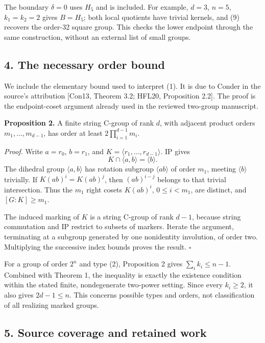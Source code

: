 \documentclass[
  11pt,
  a4paper,
]{article}
\begin{document}
The boundary \(\delta=0\) uses \(H_5\) and is included. For example,
\(d=3\), \(n=5\), \(k_1=k_2=2\) gives \(B=H_5\); both local quotients
have trivial kernels, and (9) recovers the order-32 square group. This
checks the lower endpoint through the same construction, without an
external list of small groups.

\subsection{4. The necessary order
bound}\label{the-necessary-order-bound}

We include the elementary bound used to interpret (1). It is due to
Conder in the source's attribution {[}Con13, Theorem 3.2; HFL20,
Proposition 2.2{]}. The proof is the endpoint-coset argument already
used in the reviewed two-group manuscript.

\textbf{Proposition 2.} A finite string C-group of rank \(d\), with
adjacent product orders \(m_1,\ldots,m_{d-1}\), has order at least
\(2\prod_{i=1}^{d-1}m_i\).

\emph{Proof.} Write \(a=r_0\), \(b=r_1\), and
\(K=\langle r_1,\ldots,r_{d-1}\rangle\). IP gives \[
K\cap\langle a,b\rangle=\langle b\rangle.
\] The dihedral group \(\langle a,b\rangle\) has rotation subgroup
\(\langle ab\rangle\) of order \(m_1\), meeting \(\langle b\rangle\)
trivially. If \(K(ab)^i=K(ab)^j\), then \((ab)^{i-j}\) belongs to that
trivial intersection. Thus the \(m_1\) right cosets \(K(ab)^i\),
\(0\le i<m_1\), are distinct, and \([G:K]\ge m_1\).

The induced marking of \(K\) is a string C-group of rank \(d-1\),
because string commutation and IP restrict to subsets of markers.
Iterate the argument, terminating at a subgroup generated by one
nonidentity involution, of order two. Multiplying the successive index
bounds proves the result. \(\square\)

For a group of order \(2^n\) and type (2), Proposition 2 gives
\(\sum_i k_i\le n-1\). Combined with Theorem 1, the inequality is
exactly the existence condition within the stated finite, nondegenerate
two-power setting. Since every \(k_i\ge2\), it also gives \(2d-1\le n\).
This concerns possible types and orders, not classification of all
realizing marked groups.

\subsection{5. Source coverage and retained
work}\label{source-coverage-and-retained-work}
\end{document}
